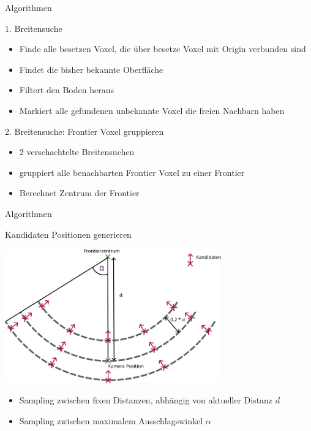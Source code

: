 \documentclass{beamer}
\begin{document}
\begin{frame}{Algorithmen}

	\begin{block}{1. Breitensuche}
		\begin{itemize}
			\item Finde alle besetzen Voxel, die über besetze Voxel mit Origin verbunden sind
			\item Findet die bisher bekannte Oberfläche
			\item Filtert den Boden heraus
			\item Markiert alle gefundenen unbekannte Voxel die freien Nachbarn haben
		\end{itemize}
	\end{block}
	\begin{exampleblock}{2. Breitensuche: Frontier Voxel gruppieren}
		\begin{itemize}
			\item 2 verschachtelte Breitensuchen
			\item gruppiert alle benachbarten Frontier Voxel zu einer Frontier
			\item Berechnet Zentrum der Frontier
		\end{itemize}
	\end{exampleblock}
\end{frame}

\begin{frame}{Algorithmen}
	\begin{block}{Kandidaten Positionen generieren}

		\begin{center}
			\includegraphics[width=0.7\textwidth]{Graphics/view_point_gen_v2.png}
		\end{center}
		\begin{itemize}
			\item Sampling zwischen fixen Distanzen, abhängig von aktueller Distanz $d$
			\item Sampling zwischen maximalem Ausschlagswinkel $\alpha$
		\end{itemize}
	\end{block}

\end{frame}
\end{document}
